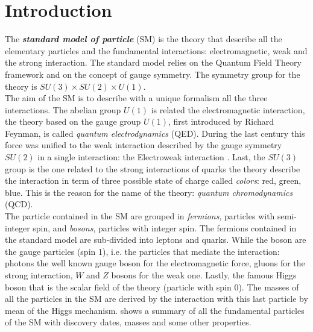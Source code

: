 %
%

\chapter{Introduction}

\setcounter{page}{1}

	The \textbf{\emph{standard model of particle}} (SM) is the theory that describe all the elementary particles and the fundamental interactions: electromagnetic, weak and the strong interaction. The standard model relies on the Quantum Field Theory framework and on the concept of gauge symmetry. The symmetry group for the theory is $SU(3)\times SU(2)\times U(1)$. 
\\
The aim of the SM is to describe with a unique formalism all the three interactions. The abelian group $U(1)$ is related the electromagnetic interaction, the theory based on the gauge group $U(1)$, first introduced by Richard Feynman, is called \textit{quantum electrodynamics} (QED). During the last century this force was unified to the weak interaction described by the gauge symmetry $SU(2)$ in a single interaction: the Electroweak interaction \cite{PhysRevLett.19.1264}. Last, the $SU(3)$ group is the one related to the strong interactions of quarks the theory describe the interaction in term of three possible state of charge called \textit{colors}: red, green, blue. This is the reason for the name of the theory: \textit{quantum chromodynamics} (QCD).
\\
The particle contained in the SM are grouped in \textit{fermions}, particles with semi-integer spin, and \textit{bosons}, particles with integer spin. The fermions contained in the standard model are sub-divided into leptons and quarks. While the boson are the gauge particles (spin 1), i.e. the particles that mediate the interaction: photons the well known gauge boson for the electromagnetic force, gluons for the strong interaction, $W$ and $Z$ bosons for the weak one. Lastly, the famous Higgs boson that is the scalar field of the theory (particle with spin 0). The masses of all the particles in the SM are derived by the interaction with this last particle by mean of the Higgs mechanism.  shows a summary of all the fundamental particles of the SM with discovery dates, masses and some other properties.

